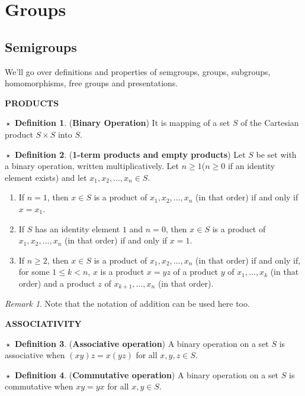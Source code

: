 \documentclass{article}
\theoremstyle{definition}
\newtheorem{definition}{$\boxed{\star}$ Definition}
\theoremstyle{remark}
\newtheorem*{remark}{Remark}
\theoremstyle{definition}
\theoremstyle{definition}
\theoremstyle{definition}
\theoremstyle{proof}
\begin{document}
\newpage
\section{Groups}
\subsection{Semigroups}
We'll go over definitions and properties of semgroups, groups, subgroups, homomorphisms, free groups and presentations.

\hrulefill
\textbf{PRODUCTS}
\hrulefill
\begin{definition}
	{(\textbf{Binary Operation})} It is mapping of a set $ S $ of the Cartesian product $ S\times S $ into $ S $.
\end{definition}
\hrulefill
\begin{definition}
{(\textbf{1-term products and empty products})}	Let $ S $ be set with a binary operation, written multiplicatively. Let $ n\ge 1 $($ n\ge 0 $ if an identity element exists) and let $ x_1,x_2,\dots, x_n \in S $. 
	\begin{enumerate}
		\item{If $ n=1$, then $ x\in S $ is a product of $ x_1,x_2,\dots,x_n$ (in that order) if and only if $ x = x_1 $. }
		\item{If $ S $ has an identity element $ 1 $ and $ n = 0 $, then $ x\in S $ is a product of $ x_1,x_2,\dots,x_n $ (in that order) if and only if $ x = 1 $.}
		\item{If $ n\ge 2 $, then $ x\in S $ is a product of $ x_1,x_2,\dots,x_n $ (in that order) if and only if, for some $ 1 \le k < n $, $ x $ is a product $ x = yz $ of a product $ y $ of $ x_1,\dots,x_k $ (in that order) and a product $ z $ of $ x_{k+1},\dots,x_n $ (in that order).}
	\end{enumerate}
\begin{remark}
	Note that the notation of addition can be used here too.
\end{remark}
\end{definition}
\hrulefill
\textbf{ASSOCIATIVITY}
\hrulefill
\begin{definition}
	(\textbf{Associative operation}) A binary operation on a set $ S $ is associative when $ (xy)z = x(yz) $ for all $ x,y,z \in S .$
\end{definition}
\hrulefill
\begin{definition}
	(\textbf{Commutative operation}) A binary operation on a set $ S $ is commutative when $ xy = yx $ for all $ x,y \in S $.
\end{definition}
\end{document}
